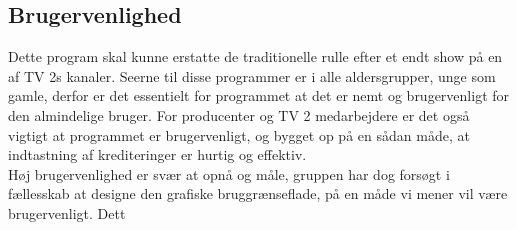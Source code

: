 \subsection{Brugervenlighed}
Dette program skal kunne erstatte de traditionelle rulle efter et endt show på en af TV 2s kanaler. Seerne til disse programmer er i alle aldersgrupper, unge som gamle, derfor er det essentielt for programmet at det er nemt og brugervenligt for den almindelige bruger. For producenter og TV 2 medarbejdere er det også vigtigt at programmet er brugervenligt, og bygget op på en sådan måde, at indtastning af krediteringer er hurtig og effektiv. \\ Høj brugervenlighed er svær at opnå og måle, gruppen har dog forsøgt i fællesskab at designe den grafiske bruggrænseflade, på en måde vi mener vil være brugervenligt. Dett